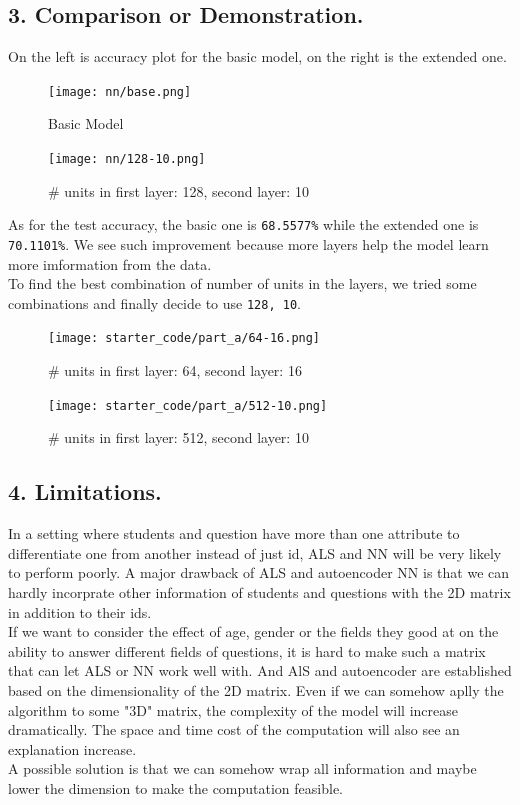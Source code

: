 \documentclass{article}
\newcommand{\coding}[1]{\colorbox{light-gray}{\texttt{#1}}}
\begin{document}
\begin{spacing}{1.5}
\subsection*{3. Comparison or Demonstration.}
On the left is accuracy plot for the basic model, on the right is the extended one.
\begin{figure}[H]
    \begin{minipage}[b]{0.5\linewidth}
        \centering
		\texttt{[image: nn/base.png]}
		\caption{Basic Model}
    \end{minipage}
    \begin{minipage}[b]{0.5\linewidth}
        \centering
		\texttt{[image: nn/128-10.png]}
		\caption{\# units in first layer: 128, second layer: 10}
    \end{minipage}
\end{figure}
As for the test accuracy, the basic one is \coding{68.5577\%} while the extended one is \coding{70.1101\%}. We see such improvement because more layers help the model learn more imformation from the data. \\
To find the best combination of number of units in the layers, we tried some combinations and finally decide to use \coding{128, 10}.
\begin{figure}[H]
    \begin{minipage}[b]{0.5\linewidth}
        \centering
		\texttt{[image: starter\_code/part\_a/64-16.png]}
		\caption{\# units in first layer: 64, second layer: 16}
    \end{minipage}
    \begin{minipage}[b]{0.5\linewidth}
        \centering
		\texttt{[image: starter\_code/part\_a/512-10.png]}
		\caption{\# units in first layer: 512, second layer: 10}
    \end{minipage}
\end{figure}
\subsection*{4. Limitations.}
In a setting where students and question have more than one attribute to differentiate one from another instead of just id, ALS and NN will be very likely to perform poorly. A major drawback of ALS and autoencoder NN 
is that we can hardly incorprate other information of students and questions with the 2D matrix in addition to their ids.\\
If we want to consider the effect of age, gender or the fields they good at on the ability to answer different fields of questions, it is hard to make such a matrix that can let ALS or NN work well with. 
And AlS and autoencoder are established based on the dimensionality of the 2D matrix. Even if we can somehow aplly the algorithm to some "3D" matrix, the complexity of the model will increase dramatically. 
The space and time cost of the computation will also see an explanation increase.\\
A possible solution is that we can somehow wrap all information and maybe lower the dimension to make the computation feasible.




\end{spacing}
\end{document}
